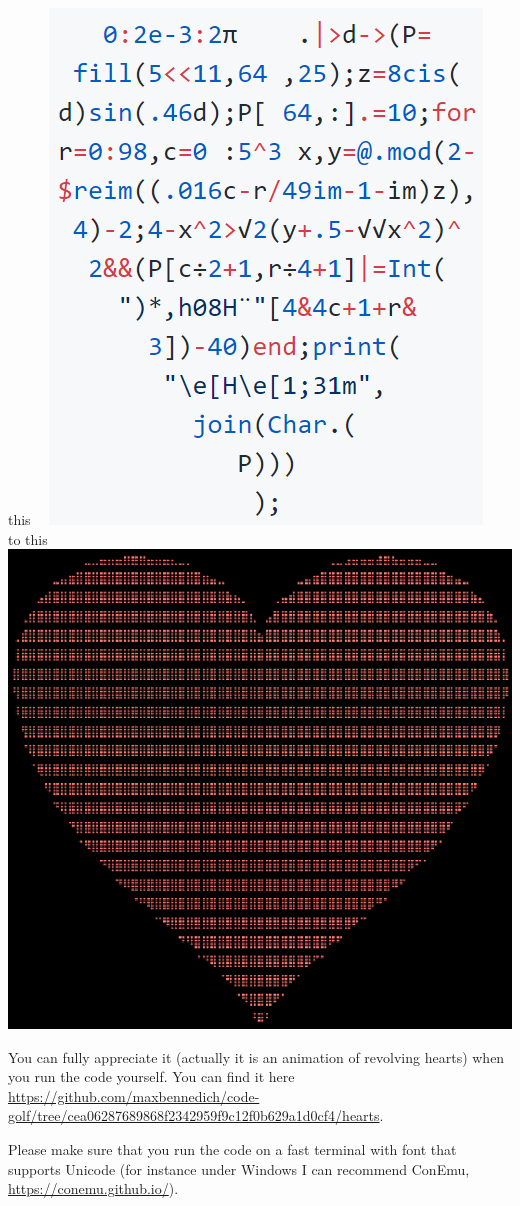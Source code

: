 \documentclass[10pt,a4paper]{article}
\begin{document}
this$\quad$
\includegraphics{heart_in.png}
$\quad$to this$\quad$
\includegraphics{heart_out.png}

You can fully appreciate it (actually it is an animation of revolving hearts) when you run the code yourself. You can find it here
\url{https://github.com/maxbennedich/code-golf/tree/cea06287689868f2342959f9c12f0b629a1d0cf4/hearts}.

Please make sure that you run the code on a fast terminal with font that supports Unicode (for instance under Windows I can recommend ConEmu, \url{https://conemu.github.io/}).
\end{document}
